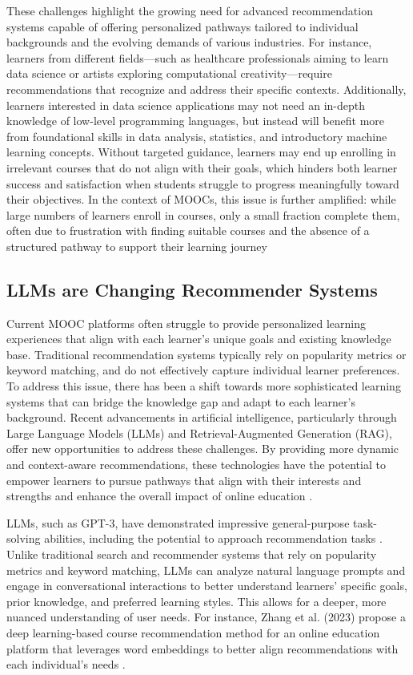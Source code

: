 These challenges highlight the growing need for advanced recommendation systems capable of offering personalized pathways tailored to individual backgrounds and the evolving demands of various industries. For instance, learners from different fields—such as healthcare professionals aiming to learn data science or artists exploring computational creativity—require recommendations that recognize and address their specific contexts. Additionally, learners interested in data science applications may not need an in-depth knowledge of low-level programming languages, but instead will benefit more from foundational skills in data analysis, statistics, and introductory machine learning concepts. Without targeted guidance, learners may end up enrolling in irrelevant courses that do not align with their goals, which hinders both learner success and satisfaction when students struggle to progress meaningfully toward their objectives. In the context of MOOCs, this issue is further amplified: while large numbers of learners enroll in courses, only a small fraction complete them, often due to frustration with finding suitable courses and the absence of a structured pathway to support their learning journey


\subsection{LLMs are Changing Recommender Systems}

Current MOOC platforms often struggle to provide personalized learning experiences that align with each learner's unique goals and existing knowledge base. Traditional recommendation systems typically rely on popularity metrics or keyword matching, and do not effectively capture individual learner preferences. To address this issue, there has been a shift towards more sophisticated learning systems that can bridge the knowledge gap and adapt to each learner’s background. Recent advancements in artificial intelligence, particularly through Large Language Models (LLMs) and Retrieval-Augmented Generation (RAG), offer new opportunities to address these challenges. By providing more dynamic and context-aware recommendations, these technologies have the potential to empower learners to pursue pathways that align with their interests and strengths and enhance the overall impact of online education \cite{khalid_recommender_2020}. 

LLMs, such as GPT-3, have demonstrated impressive general-purpose task-solving abilities, including the potential to approach recommendation tasks \cite{noauthor_language_nodate}. Unlike traditional search and recommender systems that rely on popularity metrics and keyword matching, LLMs can analyze natural language prompts and engage in conversational interactions to better understand learners’ specific goals, prior knowledge, and preferred learning styles. This allows for a deeper, more nuanced understanding of user needs. For instance, Zhang et al. (2023) propose a deep learning-based course recommendation method for an online education platform that leverages word embeddings to better align recommendations with each individual’s needs \cite{zhang_personalized_2023}. 

